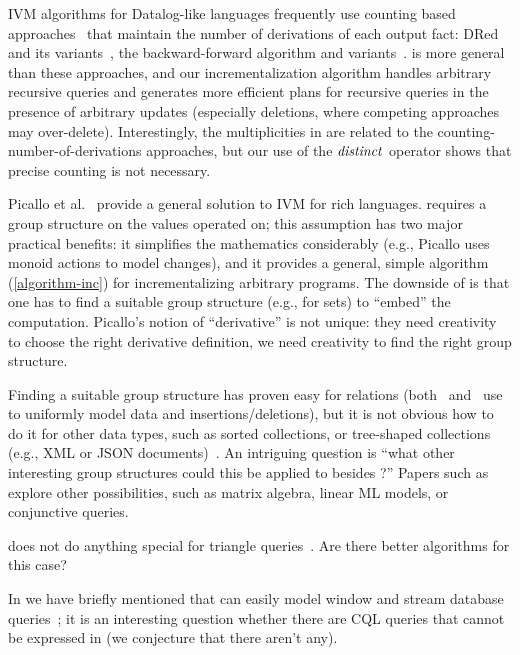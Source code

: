 IVM algorithms for Datalog-like languages frequently use counting based
approaches~\cite{Dewan-iis92,motik-aaai15} that maintain the number of derivations of each
output fact: DRed~\cite{gupta-sigmod93} and its variants~\cite{Ceri-VLDB91,Wolfson-sigmod91,%
Staudt-vldb96,Kotowski-rr11,Lu-sigmod95,Apt-sigmod87}, the backward-forward algorithm
and variants~\cite{motik-aaai15,Harrison-wdd92,motik-ai19}.
\dbsp is more general than these approaches,
and our incrementalization algorithm handles arbitrary recursive queries and
generates more efficient plans for recursive queries
in the presence of arbitrary updates (especially deletions, where competing approaches
may over-delete).  Interestingly, the \zrs multiplicities in \dbsp are related
to the counting-number-of-derivations approaches, but our use of the $\mathit{distinct}$
operator shows that precise counting is not necessary.

Picallo et al.~\cite{picallo-scop19} provide a general solution to IVM for
rich languages.  \dbsp requires a group structure on the values operated on;
this assumption has two major practical benefits: it simplifies the mathematics considerably
(e.g., Picallo uses monoid actions to model changes), and it provides a general, simple
algorithm (\ref{algorithm-inc}) for incrementalizing arbitrary programs.  The downside of
\dbsp is that one has to find a suitable group structure (e.g., \zrs for sets) to ``embed''
the computation.  Picallo's notion of ``derivative'' is not unique: they need creativity to choose
the right derivative definition, we need creativity to find the right group structure.

Finding a suitable group structure has proven easy for relations (both~\cite{koch-pods10}
and~\cite{green-tcs11} use \zrs to uniformly model data and insertions/deletions), but it is
not obvious how to do it for other data types, such as sorted collections, or tree-shaped
collections (e.g., XML or JSON documents)~\cite{foster-planx08}.  An intriguing question
is ``what other interesting group structures could this be applied to besides \zrs?''
Papers such as~\cite{nikolic-icmd18} explore other possibilities, such as matrix algebra,
linear ML models, or conjunctive queries.

\dbsp does not do anything special for triangle queries~\cite{kara-tds20}.  Are there
better algorithms for this case?

In  we have briefly mentioned that \dbsp can easily
model window and stream database queries~\cite{arasu-tr02,aurora}; it is an
interesting question whether there are CQL queries that cannot be expressed in \dbsp
(we conjecture that there aren't any).


